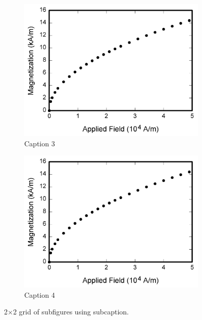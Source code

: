 \begin{figure}[htbp]
    \begin{subfigure}{0.45\columnwidth}
        \includegraphics[width=\linewidth]{Photos/fig1.png}
        \caption{Caption 3}
        \label{fig:2c}
    \end{subfigure}\hfill
    \begin{subfigure}{0.45\columnwidth}
        \includegraphics[width=\linewidth]{Photos/fig1.png}
        \caption{Caption 4}
        \label{fig:2d}
    \end{subfigure}

    \caption{2×2 grid of subfigures using subcaption.}
    \label{fig:grid_subcaption}
\end{figure}




